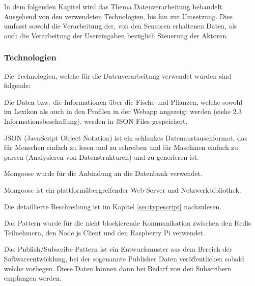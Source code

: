 In dem folgenden Kapitel wird das Thema Datenverarbeitung behandelt. Ausgehend von den verwendeten Technologien, bis hin zur Umsetzung. Dies umfasst sowohl die Verarbeitung der, von den Sensoren erhaltenen Daten, als auch die Verarbeitung der Usereingaben bezüglich Steuerung der Aktoren.

\subsubsection{Technologien}
\label{sec:technologien}
Die Technologien, welche für die Datenverarbeitung verwendet wurden sind folgende:

Die Daten bzw. die Informationen über die Fische und Pflanzen, welche sowohl im Lexikon als auch in den Profilen in der Webapp angezeigt werden (siehe 2.3 Informationsbeschaffung), werden in JSON Files gespeichert. 

JSON (JavaScript Object Notation) ist ein schlankes Datenaustauschformat, das für Menschen einfach zu lesen und zu schreiben und für Maschinen einfach zu parsen (Analysieren von Datenstrukturen) und zu generieren ist. \cite{JSON}

Mongoose wurde für die Anbindung an die Datenbank verwendet.

Mongoose ist ein plattformübergreifender Web-Server und Netzwerkbibliothek. \cite{Mongoose}

Die detaillierte Beschreibung ist im Kapitel \ref{sec:typescript} nachzulesen.

Das Pattern wurde für die nicht blockierende Kommunikation zwischen den Redis Teilnehmern, den Node.js Client und den Raspberry Pi verwendet.

Das Publish/Subscribe Pattern ist ein Entwurfsmuster aus dem Bereich der Softwareentwicklung, bei der sogenannte Publisher Daten veröffentlichen sobald welche vorliegen. Diese Daten können dann bei Bedarf von den Subscribern empfangen werden.


